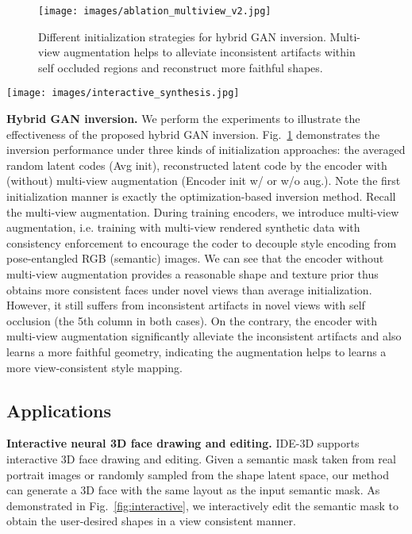 \documentclass[acmtog]{acmart}
\begin{document}
\begin{figure}[b]
  \centering
  \texttt{[image: images/ablation\_multiview\_v2.jpg]}
  \caption{Different initialization strategies for hybrid GAN inversion. Multi-view augmentation helps to alleviate inconsistent artifacts within self occluded regions and reconstruct more faithful shapes. }
  \Description{}
  \label{fig:multiview}
\end{figure}


\begin{figure*}[t]
  \centering
  \texttt{[image: images/interactive\_synthesis.jpg]}
  \caption{Interactive 3D face drawing. Our method supports interactively synthesize view-consistent photo-realistic portrait images by drawing a semantic mask. The figure shows some facial attribute editing examples, e.g. hairstyle, glass (the first raw), hat, eyes and expression (the second raw). We can observe that our method preserves the unedited local regions well when manipulating the shape and expressions.}
  \Description{}
  \label{fig:interactive}
\end{figure*}

\noindent \textbf{Hybrid GAN inversion.} We perform the experiments to illustrate the effectiveness of the proposed hybrid GAN inversion. Fig.~\ref{fig:multiview} demonstrates the inversion performance under three kinds of initialization approaches: the averaged random latent codes (Avg init), reconstructed latent code by the encoder with (without) multi-view augmentation (Encoder init w/ or w/o aug.). Note the first initialization manner is exactly the optimization-based inversion method. Recall the multi-view augmentation. During training encoders, we introduce multi-view augmentation, i.e. training with multi-view rendered synthetic data with consistency enforcement to encourage the coder to decouple style encoding from pose-entangled RGB (semantic) images.
We can see that the encoder without multi-view augmentation provides a reasonable shape and texture prior thus obtains more consistent faces under novel views than average initialization. However, it still suffers from inconsistent artifacts in novel views with self occlusion (the 5th column in both cases). On the contrary, the encoder with multi-view augmentation significantly alleviate the inconsistent artifacts and also learns a more faithful geometry,  indicating the augmentation helps to learns a more view-consistent style mapping. 



\subsection{Applications}
\label{sec:4.3}
\noindent \textbf{Interactive neural 3D face drawing and editing.} IDE-3D supports interactive 3D face drawing and editing. Given a semantic mask taken from real portrait images or randomly sampled from the shape latent space, our method can generate a 3D face with the same layout as the input semantic mask. As demonstrated in Fig.~\ref{fig:interactive}, we interactively edit the semantic mask to obtain the user-desired shapes in a view consistent manner. 
\end{document}
